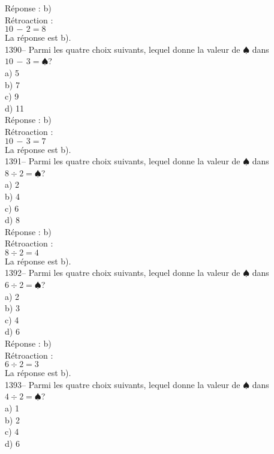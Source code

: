 ﻿\documentclass[letterpaper, 12pt]{article}
\begin{document}
R\'eponse : b)\\

R\'etroaction : \\
$10\,-\,2=8$\\
La r\'eponse est b).\\

1390-- Parmi les quatre choix suivants, lequel donne la valeur de
$\spadesuit$ dans $10\,-\,3=\spadesuit$?\\
a) 5\\
b) 7\\
c) 9\\
d) 11\\

R\'eponse : b)\\

R\'etroaction : \\
$10\,-\,3=7$\\
La r\'eponse est b).\\

1391-- Parmi les quatre choix suivants, lequel donne la valeur de
$\spadesuit$ dans $8\div2=\spadesuit$?\\
a) 2\\
b) 4\\
c) 6\\
d) 8\\

R\'eponse : b)\\

R\'etroaction : \\
$8\div2=4$\\
La r\'eponse est b).\\

1392-- Parmi les quatre choix suivants, lequel donne la valeur de
$\spadesuit$ dans $6\div2=\spadesuit$?\\
a) 2\\
b) 3\\
c) 4\\
d) 6\\

R\'eponse : b)\\

R\'etroaction : \\
$6\div2=3$\\
La r\'eponse est b).\\

1393-- Parmi les quatre choix suivants, lequel donne la valeur de
$\spadesuit$ dans $4\div2=\spadesuit$?\\
a) 1\\
b) 2\\
c) 4\\
d) 6\\
\end{document}
